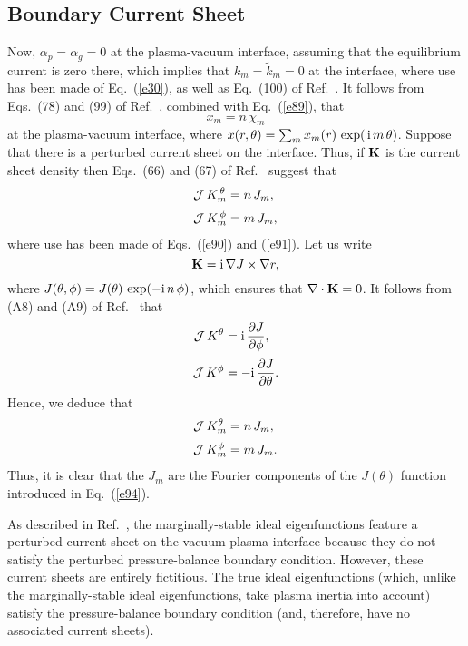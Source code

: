 \documentclass[12pt,prb,aps]{revtex4-1}
\begin{document}
\subsection{Boundary Current Sheet}
Now, $\alpha_p=\alpha_g=0$ at the plasma-vacuum interface, assuming that the  equilibrium current is zero there,
which implies that $k_m=\tilde{k}_m=0$ at the interface, where use has been made of Eq.~(\ref{e30}),
as well as Eq.~(100) of Ref.~.  It follows from Eqs.~(78) and (99) of Ref.~, combined with Eq.~(\ref{e89}),  that 
\begin{equation}\label{e91}
x_m= n\,\chi_m
\end{equation}
at the plasma-vacuum interface, where $x(r,\theta)=\sum_m x_m(r)\,\exp(\,{\rm i}\,m\,\theta)$. 
Suppose that there is a perturbed current sheet on the interface. 
Thus, if ${\bf K}$ is the current sheet density then Eqs.~(66) and (67) of Ref.~ suggest that
\begin{align}
{\cal J}\,K_m^{\,\theta} &=  n\,J_m,\\[0.5ex]
{\cal J}\,K_m^{\,\phi} &=m\,J_m,
\end{align}
where use has been made of Eqs.~(\ref{e90}) and (\ref{e91}). 
Let us write
\begin{equation}\label{e94}
{\bf K} = {\rm i}\,\nabla J\times \nabla r,
\end{equation}
where $J(\theta,\phi)=J(\theta)\,\exp(-{\rm i}\,n\,\phi)$, which ensures that $\nabla\cdot{\bf K}=0$. It follows from (A8) and (A9) of Ref.~ that
\begin{align}
{\cal J}\,K^\theta&= {\rm i}\,\frac{\partial J}{\partial \phi},\\[0.5ex]
{\cal J}\,K^\phi &=-{\rm i}\,\frac{\partial J}{\partial\theta}.
\end{align}
Hence, we deduce that 
\begin{align}
{\cal J}\,K^\theta_m&= n\,J_m,\\[0.5ex]
{\cal J}\,K^\phi_m &=m\,J_m.
\end{align}
Thus, it is clear that the $J_m$ are the Fourier components of the $J(\theta)$ function introduced in Eq.~(\ref{e94}). 

As described in Ref.~, the marginally-stable ideal eigenfunctions   feature a perturbed current sheet on the vacuum-plasma interface because they do not satisfy the
perturbed  pressure-balance boundary condition.
However, these current sheets are entirely fictitious. The true ideal eigenfunctions (which, unlike the marginally-stable ideal eigenfunctions, take plasma inertia into account)
satisfy the pressure-balance boundary condition (and, therefore, have no associated current sheets). 
\end{document}
